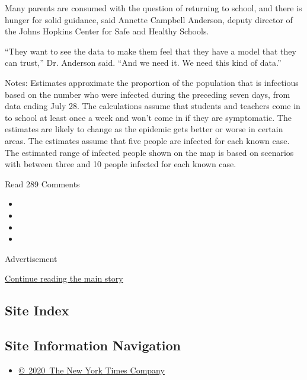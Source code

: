 Many parents are consumed with the question of returning to school, and
there is hunger for solid guidance, said Annette Campbell Anderson,
deputy director of the Johns Hopkins Center for Safe and Healthy
Schools.

``They want to see the data to make them feel that they have a model
that they can trust,'' Dr. Anderson said. ``And we need it. We need this
kind of data.''

Notes: Estimates approximate the proportion of the population that is
infectious based on the number who were infected during the preceding
seven days, from data ending July 28. The calculations assume that
students and teachers come in to school at least once a week and won't
come in if they are symptomatic. The estimates are likely to change as
the epidemic gets better or worse in certain areas. The estimates assume
that five people are infected for each known case. The estimated range
of infected people shown on the map is based on scenarios with between
three and 10 people infected for each known case.

Read 289 Comments

\begin{itemize}
\item
\item
\item
\item
\end{itemize}

Advertisement

\protect\hyperlink{after-bottom}{Continue reading the main story}

\hypertarget{site-index}{%
\subsection{Site Index}\label{site-index}}

\hypertarget{site-information-navigation}{%
\subsection{Site Information
Navigation}\label{site-information-navigation}}

\begin{itemize}
\tightlist
\item
  \href{https://help.nytimes3xbfgragh.onion/hc/en-us/articles/115014792127-Copyright-notice}{©~2020~The
  New York Times Company}
\end{itemize}

